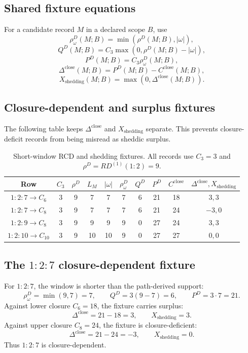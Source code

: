 \subsection{Shared fixture equations}\label{manual:short-window:equations}
For a candidate record \(M\) in a declared scope \(B\), use
\[
\rho^D_\omega(M;B)=\min(\rho^D(M;B),|\omega|),
\]
\[
Q^D(M;B)
=
C_3\max(0,\rho^D(M;B)-|\omega|),
\]
\[
P^D(M;B)=C_3\rho^D_\omega(M;B),
\]
\[
\Delta^{\mathrm{close}}(M;B)=P^D(M;B)-C^{\mathrm{close}}(M;B),
\]
\[
X_{\mathrm{shedding}}(M;B)=\max(0,\Delta^{\mathrm{close}}(M;B)).
\]

\subsection{Closure-dependent and surplus fixtures}\label{manual:short-window:fixture-table}
The following table keeps \(\Delta^{\mathrm{close}}\) and \(X_{\mathrm{shedding}}\) separate. This prevents closure-deficit records from being misread as sheddic surplus.

\begin{table}[h]
\centering
\scriptsize
\caption{Short-window RCD and shedding fixtures. All records use \(C_3=3\) and \(\rho^D=RD^{(1)}(1{:}2)=9\).}
\begin{tabular}{c c c c c c c c c c}
\toprule
Row & \(C_3\) & \(\rho^D\) & \(L_M\) & \(|\omega|\) & \(\rho^D_\omega\) & \(Q^D\) & \(P^D\) & \(C^{\mathrm{close}}\) & \(\Delta^{\mathrm{close}},X_{\mathrm{shedding}}\)\\
\midrule
\(1{:}2{:}7\to C_6\) & 3 & 9 & 7 & 7 & 7 & 6 & 21 & 18 & \(3,3\)\\
\(1{:}2{:}7\to C_8\) & 3 & 9 & 7 & 7 & 7 & 6 & 21 & 24 & \(-3,0\)\\
\(1{:}2{:}9\to C_8\) & 3 & 9 & 9 & 9 & 9 & 0 & 27 & 24 & \(3,3\)\\
\(1{:}2{:}10\to C_{10}\) & 3 & 9 & 10 & 10 & 9 & 0 & 27 & 27 & \(0,0\)\\
\bottomrule
\end{tabular}
\label{tab:manual-short-window-fixtures}
\end{table}

\subsection{The \texorpdfstring{\(1{:}2{:}7\)}{1:2:7} closure-dependent fixture}\label{manual:short-window:127}
For \(1{:}2{:}7\), the window is shorter than the path-derived support:
\[
\rho^D_\omega=\min(9,7)=7,
\qquad
Q^D=3(9-7)=6,
\qquad
P^D=3\cdot7=21.
\]
Against lower closure \(C_6=18\), the fixture carries surplus:
\[
\Delta^{\mathrm{close}}=21-18=3,
\qquad
X_{\mathrm{shedding}}=3.
\]
Against upper closure \(C_8=24\), the fixture is closure-deficient:
\[
\Delta^{\mathrm{close}}=21-24=-3,
\qquad
X_{\mathrm{shedding}}=0.
\]
Thus \(1{:}2{:}7\) is closure-dependent.

